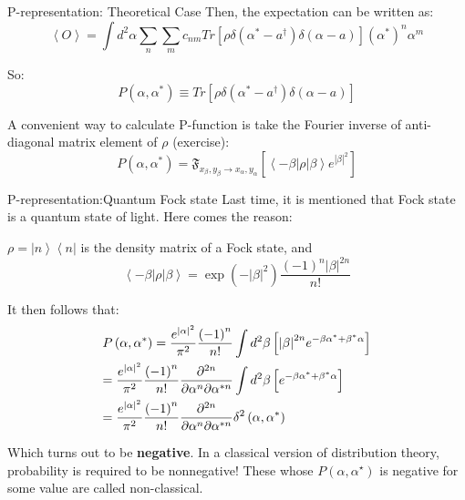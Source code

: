 \documentclass{beamer}
\begin{document}
\begin{frame}{P-representation: Theoretical Case}
Then, the expectation can be written as:
\[\left\langle O \right\rangle  = \int {{d^2}\alpha \sum\limits_n {\sum\limits_m {{c_{nm}}Tr\left[ {\rho \delta \left( {{\alpha ^*} - {a^\dag }} \right)\delta \left( {\alpha  - a} \right)} \right]{{\left( {{\alpha ^*}} \right)}^n}{\alpha ^m}} } } \]

So:
\[P\left( {\alpha ,{\alpha ^*}} \right) \equiv Tr\left[ {\rho \delta \left( {{\alpha ^*} - {a^\dag }} \right)\delta \left( {\alpha  - a} \right)} \right]\]

A convenient way to calculate P-function is take the Fourier inverse of anti-diagonal matrix element of $\rho$ (exercise):
\[P\left( {\alpha ,{\alpha ^*}} \right) = {\mathfrak{F}_{{x_\beta },{y_\beta } \to {x_\alpha },{y_\alpha }}}\left[ {\left\langle { - \beta } \right|\rho \left| \beta  \right\rangle {e^{{{\left| \beta  \right|}^2}}}} \right]\]

\end{frame}

\begin{frame}{P-representation:Quantum Fock state}
Last time, it is mentioned that Fock state is a quantum state of light. Here comes the reason:

$\rho  = \left| n \right\rangle \left\langle n \right|$ is the density matrix of a Fock state, and 
\[\left\langle { - \beta } \right|\rho \left| \beta  \right\rangle  = \exp \left( { - {{\left| \beta  \right|}^2}} \right)\frac{{{{\left( { - 1} \right)}^n}{{\left| \beta  \right|}^{2n}}}}{{n!}}\]

It then follows that:
\[\begin{gathered}
P\left( {\alpha ,{\alpha ^*}} \right) = \frac{{{e^{{{\left| \alpha  \right|}^2}}}}}{{{\pi ^2}}}\frac{{{{\left( { - 1} \right)}^n}}}{{n!}}\int {{d^2}\beta } \left[ {{{\left| \beta  \right|}^{2n}}{e^{ - \beta {\alpha ^*} + {\beta ^*}\alpha }}} \right] \hfill \\
= \frac{{{e^{{{\left| \alpha  \right|}^2}}}}}{{{\pi ^2}}}\frac{{{{\left( { - 1} \right)}^n}}}{{n!}}\frac{{{\partial ^{2n}}}}{{\partial {\alpha ^n}\partial {\alpha ^{*n}}}}\int {{d^2}\beta } \left[ {{e^{ - \beta {\alpha ^*} + {\beta ^*}\alpha }}} \right] \hfill \\
= \frac{{{e^{{{\left| \alpha  \right|}^2}}}}}{{{\pi ^2}}}\frac{{{{\left( { - 1} \right)}^n}}}{{n!}}\frac{{{\partial ^{2n}}}}{{\partial {\alpha ^n}\partial {\alpha ^{*n}}}}{\delta ^2}\left( {\alpha ,{\alpha ^*}} \right) \hfill \\ 
\end{gathered} \]

Which turns out to be \textbf{negative}. In a classical version of distribution theory, probability is required to be nonnegative! These whose $P(\alpha,\alpha^{\star})$ is negative for some value are called non-classical. 
\end{frame}
\end{document}
